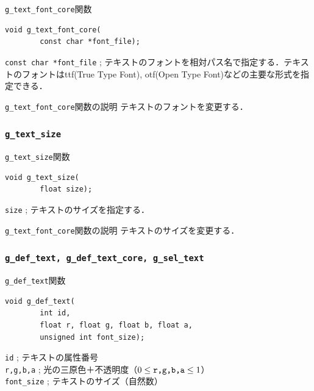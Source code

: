 \documentclass[platex,a4paper,12pt]{jsarticle}%
\begin{document}
\begin{itembox}[l]{\texttt{g\_text\_font\_core}関数}
\begin{verbatim}
void g_text_font_core(
        const char *font_file);
\end{verbatim}
\verb|const char *font_file| ; テキストのフォントを相対パス名で指定する．テキストのフォントはttf(True Type Font), otf(Open Type Font)などの主要な形式を指定できる．\\
\end{itembox}

\begin{itembox}[l]{\texttt{g\_text\_font\_core}関数の説明}
テキストのフォントを変更する．
\end{itembox}

\subsubsection{\texttt{g\_text\_size}}

\begin{itembox}[l]{\texttt{g\_text\_size}関数}
\begin{verbatim}
void g_text_size(
        float size);
\end{verbatim}
\verb|size| ; テキストのサイズを指定する．
\end{itembox}

\begin{itembox}[l]{\texttt{g\_text\_font\_core}関数の説明}
	テキストのサイズを変更する．
\end{itembox}


\clearpage
\subsubsection{\texttt{g\_def\_text, g\_def\_text\_core, g\_sel\_text}}

\begin{itembox}[l]{\texttt{g\_def\_text}関数}
\begin{verbatim}
void g_def_text(
        int id,
        float r, float g, float b, float a,
        unsigned int font_size);
\end{verbatim}
\verb|id| ; テキストの属性番号\\
\verb|r,g,b,a| ; 光の三原色＋不透明度（$0\leq \verb|r,g,b,a| \leq 1$）\\
\verb|font_size| ; テキストのサイズ（自然数）
\end{itembox}
\end{document}
